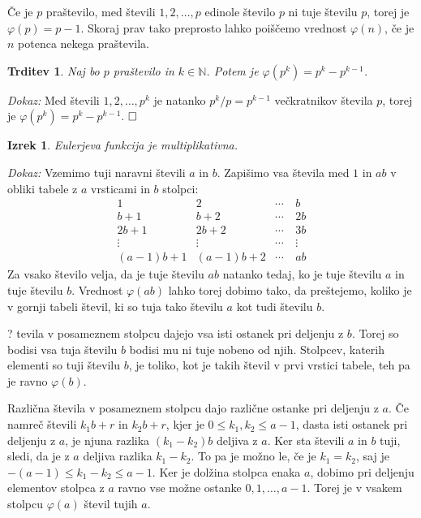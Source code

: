 \documentclass[a4paper,12pt]{article}
\def\N{\mathbb{N}} %
\def\qed{$\hfill\Box$}   %
\newtheorem{izrek}{Izrek}
\newtheorem{trditev}{Trditev}
\begin{document}
Če je $p$ praštevilo, med števili $1,2,\ldots, p$ edinole število $p$ ni tuje številu $p$,
torej je $\varphi(p) = p-1$. Skoraj prav tako preprosto lahko poiščemo vrednost $\varphi(n)$,
če je $n$ potenca nekega praštevila.

\begin{trditev}
\label{fipp}
Naj bo $p$ praštevilo in $k \in \N$. Potem je $\varphi(p^k) = p^k-p^{k-1}$.
\end{trditev}

\noindent
{\em Dokaz:\/}%
Med števili $1,2,\ldots, p^k$ je natanko $p^k/p = p^{k-1}$ večkratnikov števila $p$, torej je $\varphi(p^k) = p^k-p^{k-1}$. 
\qed

\begin{izrek}
\label{fimult}
Eulerjeva funkcija je multiplikativna.
\end{izrek}

\noindent
{\em Dokaz:\/} Vzemimo tuji naravni števili $a$ in $b$. Zapišimo vsa števila med $1$ in $ab$
v obliki tabele z $a$ vrsticami in $b$ stolpci:
\[
\begin{array}{cccc}
1 & 2 & \cdots & \ b \\
b+1 & b+2 & \cdots & \ 2b \\
2b+1 & 2b+2 & \cdots & \ 3b \\
\vdots & \vdots & \cdots & \ \vdots \\
(a-1)b+1 & (a-1)b+2 & \cdots & \ ab 
\end{array}
\]
Za vsako število velja, da je tuje številu $ab$ natanko tedaj, ko je tuje številu $a$ in tuje številu $b$.
Vrednost $\varphi(ab)$ lahko torej dobimo tako, da preštejemo, koliko je v gornji tabeli števil, ki so tuja
tako številu $a$ kot tudi številu $b$. 

? tevila v posameznem stolpcu dajejo vsa isti ostanek pri deljenju z $b$. Torej so bodisi vsa tuja številu
$b$ bodisi mu ni tuje nobeno od njih. Stolpcev, katerih elementi so tuji številu $b$, je toliko, kot je
takih števil v prvi vrstici tabele, teh pa je ravno $\varphi(b)$.

Različna števila v posameznem stolpcu dajo različne ostanke pri deljenju z $a$. Če namreč števili
$k_1 b + r$ in $k_2 b + r$, kjer je $0 \le k_1, k_2 \le a-1$, dasta isti ostanek pri deljenju z $a$, je njuna razlika $(k_1 - k_2) b$
deljiva z $a$. Ker sta števili $a$ in $b$ tuji, sledi, da je z $a$ deljiva razlika $k_1 - k_2$.
To pa je možno le, če je $k_1 = k_2$, saj je $-(a-1) \le k_1 - k_2 \le a-1$. Ker je dolžina stolpca
enaka $a$, dobimo pri deljenju elementov stolpca z $a$ ravno vse možne ostanke $0, 1,\ldots, a-1$.
Torej je v vsakem stolpcu $\varphi(a)$ števil tujih $a$. 
\end{document}
